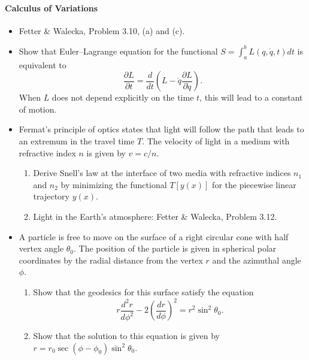 \documentclass[letterpaper,11pt]{article}
\begin{document}
\paragraph*{Calculus of Variations}
\begin{itemize}
 \item Fetter \& Walecka, Problem 3.10, (a) and (c).
 \item Show that Euler--Lagrange equation for the functional $S = \int_a^b L(q,\dot{q},t) dt$ is equivalent to
  \begin{equation}
   \frac{\partial L}{\partial t} = \frac{d}{dt} \left( L - \dot{q} \frac{\partial L}{\partial \dot{q}} \right).
  \end{equation}
 When $L$ does not depend explicitly on the time $t$, this will lead to a constant of motion.
 \item Fermat's principle of optics states that light will follow the path that leads to an extremum in the travel time $T$.  The velocity of light in a medium with refractive index $n$ is given by $v = c/n$.
 \begin{enumerate}
  \item Derive Snell's law at the interface of two media with refractive indices $n_1$ and $n_2$ by minimizing the functional $T[y(x)]$ for the piecewise linear trajectory $y(x)$.
  \item Light in the Earth's atmosphere: Fetter \& Walecka, Problem 3.12.
 \end{enumerate}
 \item A particle is free to move on the surface of a right circular cone with half vertex angle $\theta_0$.  The position of the particle is given in spherical polar coordinates by the radial distance from the vertex $r$ and the azimuthal angle $\phi$.
 \begin{enumerate}
  \item Show that the geodesics for this surface satisfy the equation
  \begin{equation*}
   r \frac{d^2 r}{d\phi^2} - 2 \left( \frac{dr}{d\phi} \right)^2 = r^2 \sin^2 \theta_0.
  \end{equation*}
  \item Show that the solution to this equation is given by $r = r_0 \sec(\phi - \phi_0) \sin^2 \theta_0$.
 \end{enumerate}
\end{itemize}
\end{document}
